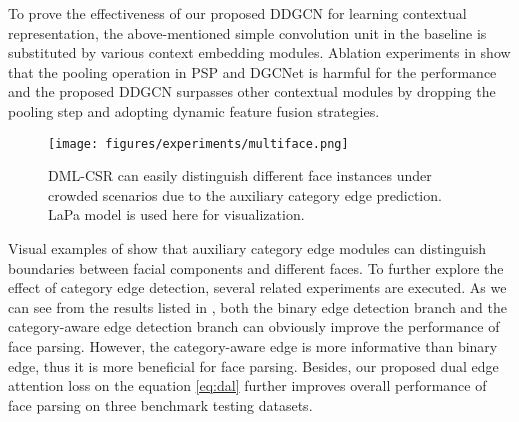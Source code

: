 \documentclass[10pt,twocolumn,letterpaper]{article}
\begin{document}
 To prove the effectiveness of our proposed DDGCN for learning contextual representation, the above-mentioned simple convolution unit in the baseline is substituted by various context embedding modules. Ablation experiments in \tableautorefname{ \ref{tab:ddgcn}} show that the pooling operation in PSP \cite{psp} and DGCNet \cite{zhangli_dgcn} is harmful for the performance and the proposed DDGCN surpasses other contextual modules by dropping the pooling step and adopting dynamic feature fusion strategies.
\begin{figure}
\centering
\texttt{[image: figures/experiments/multiface.png]}
\vspace{-2.5mm}
\caption{DML-CSR can easily distinguish different face instances under crowded scenarios due to the auxiliary category edge prediction. LaPa model is used here for visualization.}
\label{fig:multiface}
\vspace{-6mm}
\end{figure}

Visual examples of \figureautorefname{ \ref{fig:multiface}} show that auxiliary category edge modules can distinguish boundaries between facial components and different faces. To further explore the effect of category edge detection, several related experiments are executed.
As we can see from the results listed in \tableautorefname{ \ref{tab:multi_task}}, both the binary edge detection branch and the category-aware edge detection branch can obviously improve the performance of face parsing. However, the category-aware edge is more informative than binary edge, thus it is more beneficial for face parsing. Besides, our proposed dual edge attention loss on the equation \eqref{eq:dal} further improves overall performance of face parsing on three benchmark testing datasets.
\end{document}
